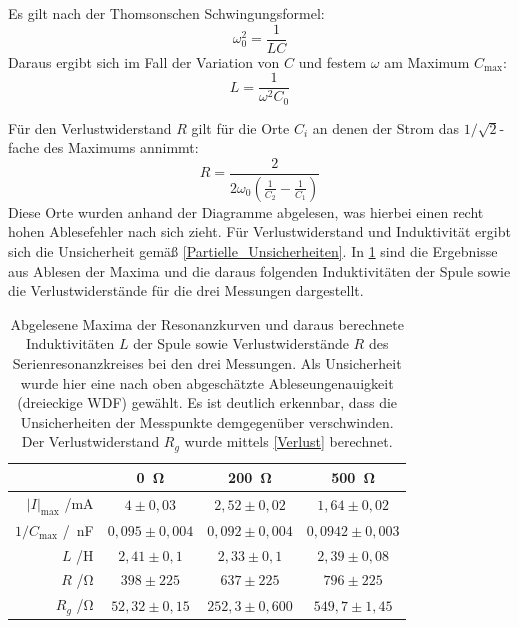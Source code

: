 \documentclass[
	a4paper,
	12pt,
	pagesize,
	ngerman
]{scrartcl}
\begin{document}
	Es gilt nach der Thomsonschen Schwingungsformel:
	\begin{equation}
		\omega_0^2=\frac{1}{LC}
	\end{equation}
	Daraus ergibt sich im Fall der Variation von $C$ und festem $\omega$ am Maximum $ C_\text{max} $:
	\begin{equation}
		L=\frac{1}{\omega^2 C_0}
		\label{Thomson}
	\end{equation}
	
	Für den Verlustwiderstand $R$ gilt für die Orte $C_i$ an denen der Strom das $ 1/\sqrt{2} $-fache des Maximums annimmt:
	\begin{equation}
		R= \frac{2}{2\omega_0 \left( \frac{1}{C_2} - \frac{1}{C_1} \right)}
	\end{equation}
	Diese Orte wurden anhand der Diagramme abgelesen, was hierbei einen recht hohen Ablesefehler nach sich zieht.
	Für Verlustwiderstand und Induktivität ergibt sich die Unsicherheit gemäß \cref{Partielle_Unsicherheiten}.
	In \cref{Serie_Erg} sind die Ergebnisse aus Ablesen der Maxima und die daraus folgenden Induktivitäten der Spule sowie die Verlustwiderstände für die drei Messungen dargestellt.
	
	\begin{table}[H]
		\centering
		\begin{tabular}{ r | c | c | c }
			&\SI{0}{\ohm} & \SI{200}{\ohm} & \SI{500}{\ohm} \\ \hline
			$\left| I \right|_\text{max}$ /\si{mA} & $4\pm 0,03$ &$2,52\pm0,02$ & $1,64\pm 0,02$\\ 
			$1/C_\text{max}$ /\si{\per \nano \farad}& $0,095 \pm 0,004$ & $0,092\pm0,004 $&$0,0942\pm0,003$ \\
			$L$ /\si{\henry} & $2,41 \pm 0,1$ & $2,33\pm 0,1 $&$2,39\pm0,08$ \\
			$R$ /\si{\ohm}  &$ 398\pm 225$&$ 637\pm 225 $ & $796 \pm 225$\\
			$R_g$ /\si{\ohm} &$ 52,32\pm0,15$ & $252,3\pm0,600$ &$549,7\pm1,45$ \\
		\end{tabular}
		\caption{Abgelesene Maxima der Resonanzkurven und daraus berechnete Induktivitäten $L$ der Spule sowie Verlustwiderstände $R$ des Serienresonanzkreises bei den drei Messungen. Als Unsicherheit wurde hier eine nach oben abgeschätzte Ableseungenauigkeit (dreieckige WDF) gewählt. Es ist deutlich erkennbar, dass die Unsicherheiten der Messpunkte demgegenüber verschwinden. Der Verlustwiderstand $R_g$ wurde mittels \cref{Verlust} berechnet.}
		\label{Serie_Erg} 
	\end{table}
	
\end{document}
